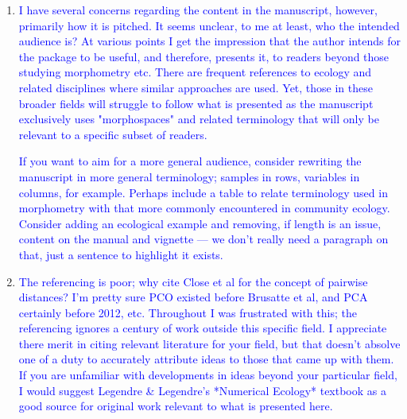 \documentclass[12pt,letterpaper]{article}
\begin{document}
\begin{enumerate}

\item{\textcolor{blue}{I have several concerns regarding the content in the manuscript, however, primarily how it is pitched.
It seems unclear, to me at least, who the intended audience is?
At various points I get the impression that the author intends for the package to be useful, and therefore, presents it, to readers beyond those studying morphometry etc.
There are frequent references to ecology and related disciplines where similar approaches are used.
Yet, those in these broader fields will struggle to follow what is presented as the manuscript exclusively uses "morphospaces" and related terminology that will only be relevant to a specific subset of readers.}

\textcolor{blue}{If you want to aim for a more general audience, consider rewriting the manuscript in more general terminology; samples in rows, variables in columns, for example.
Perhaps include a table to relate terminology used in morphometry with that more commonly encountered in community ecology.
Consider adding an ecological example and removing, if length is an issue, content on the manual and vignette --- we don't really need a paragraph on that, just a sentence to highlight it exists.}}


\item{\textcolor{blue}{The referencing is poor; why cite Close et al for the concept of pairwise distances?
I'm pretty sure PCO existed before Brusatte et al, and PCA certainly before 2012, etc.
Throughout I was frustrated with this; the referencing ignores a century of work outside this specific field.
I appreciate there merit in citing relevant literature for your field, but that doesn't absolve one of a duty to accurately attribute ideas to those that came up with them.
If you are unfamiliar with developments in ideas beyond your particular field, I would suggest Legendre \& Legendre's *Numerical Ecology* textbook as a good source for original work relevant to what is presented here.}}



\end{enumerate}
\end{document}
